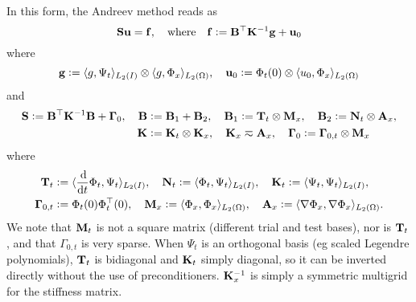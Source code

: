 \documentclass[11pt,a4paper]{amsart}
\theoremstyle{definition}
\newcommand{\kron}{\otimes}
\begin{document}
In this form, the Andreev method reads as
\[
  {\bf S} {\bf u} = {\bf f}, \quad \text{where} \quad {\bf f} := {\bf B}^\top {\bf K}^{-1} {\bf g} + {\bf u}_0
\]
where
\[
  {\bf g} := \langle g, \Psi_t \rangle_{L_2(I)} \kron \langle g, \Phi_x \rangle_{L_2(\Omega)}, \quad {\bf u}_0 := \Phi_t(0) \kron \langle u_0, \Phi_x \rangle_{L_2(\Omega)}
\]
and
\begin{align*}
  {\bf S} := {\bf B}^\top {\bf K}^{-1} {\bf B} + {\bf \Gamma}_0, \quad
  {\bf B} &:= {\bf B}_1 + {\bf B}_2, \quad
  {\bf B}_1 := {\bf T}_t \kron {\bf M}_x,
  \quad {\bf B}_2 := {\bf N}_t \kron {\bf A}_x, \\
  {\bf K} &:= {\bf K}_t \kron {\bf K}_x, \quad {\bf K}_x \eqsim {\bf A}_x,
  \quad {\bf \Gamma}_0 := {\bf \Gamma}_{0,t} \kron {\bf M}_x
\end{align*}
where
\begin{align*}
  {\bf T}_t &:= \langle \frac{\dif}{\dif t} \Phi_t, \Psi_t \rangle_{L_2(I)}, \quad %
  {\bf N}_t := \langle \Phi_t, \Psi_t \rangle_{L_2(I)}, \quad %
  {\bf K}_t := \langle \Psi_t, \Psi_t \rangle_{L_2(I)}, \\ %
  {\bf \Gamma}_{0,t} &:= \Phi_t(0) \Phi_t^\top(0), \quad %
  {\bf M}_x := \langle \Phi_x, \Phi_x \rangle_{L_2(\Omega)}, \quad %
  {\bf A}_x := \langle \nabla \Phi_x, \nabla \Phi_x \rangle_{L_2(\Omega)}. %
\end{align*}
We note that ${\bf M}_t$ is not a square matrix (different trial and test bases), nor is ${\bf T}_t$, and that ${\Gamma}_{0,t}$ is very sparse. When $\Psi_t$ is an orthogonal basis (eg scaled Legendre polynomials), ${\bf T}_t$ is bidiagonal and ${\bf K}_t$  simply diagonal, so it can be inverted directly without the use of preconditioners. ${\bf K}_x^{-1}$ is simply a symmetric multigrid for the stiffness matrix.
\end{document}
